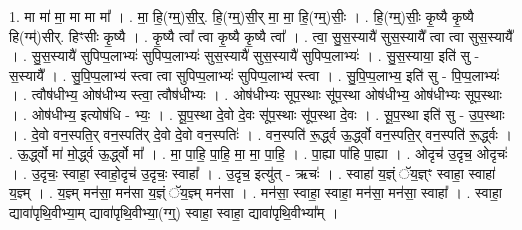 \documentclass[17pt]{extarticle}
\begin{document}
1. मा मा॑ मा॒ मा मा मा᳚ । . मा॒ हि॒(ग्म्॒)सी॒र्॒. हि॒(ग्म्॒)सी॒र् मा॒ मा॒ हि॒(ग्म्॒)सीः॒ । . हि॒(ग्म्॒)सीः॒ कृ॒ष्यै कृ॒ष्यै हि(ग्म्॑)सीर्. हिꣳसीः कृ॒ष्यै । . कृ॒ष्यै त्वा᳚ त्वा कृ॒ष्यै कृ॒ष्यै त्वा᳚ । . त्वा॒ सु॒स॒स्यायै॑ सुस॒स्यायै᳚ त्वा त्वा सुस॒स्यायै᳚ । . सु॒स॒स्यायै॑ सुपिप्प॒लाभ्यः॑ सुपिप्प॒लाभ्यः॑ सुस॒स्यायै॑ सुस॒स्यायै॑ सुपिप्प॒लाभ्यः॑ । . सु॒स॒स्याया॒ इति॑ सु - स॒स्यायै᳚ । . सु॒पि॒प्प॒लाभ्य॑ स्त्वा त्वा सुपिप्प॒लाभ्यः॑ सुपिप्प॒लाभ्य॑ स्त्वा । . सु॒पि॒प्प॒लाभ्य॒ इति॑ सु - पि॒प्प॒लाभ्यः॑ । . त्वौष॑धीभ्य॒ ओष॑धीभ्य स्त्वा॒ त्वौष॑धीभ्यः । . ओष॑धीभ्यः सूप॒स्थाः सू॑प॒स्था ओष॑धीभ्य॒ ओष॑धीभ्यः सूप॒स्थाः । . ओष॑धीभ्य॒ इत्योष॑धि - भ्यः॒ । . सू॒प॒स्था दे॒वो दे॒वः सू॑प॒स्थाः सू॑प॒स्था दे॒वः । . सू॒प॒स्था इति॑ सु - उ॒प॒स्थाः । . दे॒वो वन॒स्पति॒र् वन॒स्पति॑र् दे॒वो दे॒वो वन॒स्पतिः॑ । . वन॒स्पति॑ रू॒र्द्ध्व ऊ॒र्द्ध्वो वन॒स्पति॒र् वन॒स्पति॑ रू॒र्द्ध्वः । . ऊ॒र्द्ध्वो मा॑ मो॒र्द्ध्व ऊ॒र्द्ध्वो मा᳚ । . मा॒ पा॒हि॒ पा॒हि॒ मा॒ मा॒ पा॒हि॒ । . पा॒ह्या पा॑हि पा॒ह्या । . ओदृच॑ उ॒दृच॒ ओदृचः॑ । . उ॒दृचः॒ स्वाहा॒ स्वाहो॒दृच॑ उ॒दृचः॒ स्वाहा᳚ । . उ॒दृच॒ इत्यु॑त् - ऋचः॑ । . स्वाहा॑ य॒ज्ञ्ं ॅय॒ज्ञ्ꣳ स्वाहा॒ स्वाहा॑ य॒ज्ञ्म् । . य॒ज्ञ्म् मन॑सा॒ मन॑सा य॒ज्ञ्ं ॅय॒ज्ञ्म् मन॑सा । . मन॑सा॒ स्वाहा॒ स्वाहा॒ मन॑सा॒ मन॑सा॒ स्वाहा᳚ । . स्वाहा॒ द्यावा॑पृथि॒वीभ्या॒म् द्यावा॑पृथि॒वीभ्या॒(ग्ग्॒) स्वाहा॒ स्वाहा॒ द्यावा॑पृथि॒वीभ्या᳚म् । \newline
\end{document}
